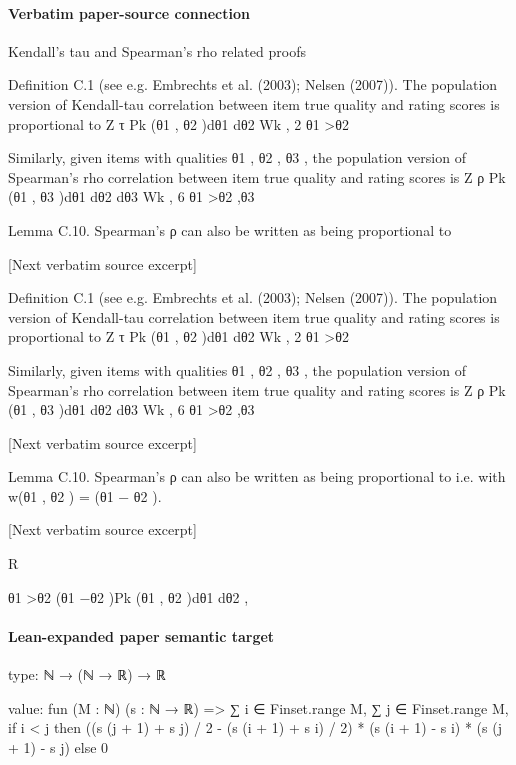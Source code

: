\documentclass[10pt]{article}
\begin{document}
\paragraph{Verbatim paper-source connection}
\begin{ReviewVerbatim}
Kendall’s tau and Spearman’s rho related proofs

Definition C.1 (see e.g. Embrechts et al. (2003); Nelsen (2007)). The population version of
Kendall-tau correlation between item true quality and rating scores is proportional to
Z
τ
Pk (θ1 , θ2 )dθ1 dθ2
Wk , 2
θ1 >θ2

Similarly, given items with qualities θ1 , θ2 , θ3 , the population version of Spearman’s rho correlation
between item true quality and rating scores is
Z
ρ
Pk (θ1 , θ3 )dθ1 dθ2 dθ3
Wk , 6
θ1 >θ2 ,θ3

Lemma C.10. Spearman’s ρ can also be written as being proportional to

[Next verbatim source excerpt]

Definition C.1 (see e.g. Embrechts et al. (2003); Nelsen (2007)). The population version of
Kendall-tau correlation between item true quality and rating scores is proportional to
Z
τ
Pk (θ1 , θ2 )dθ1 dθ2
Wk , 2
θ1 >θ2

Similarly, given items with qualities θ1 , θ2 , θ3 , the population version of Spearman’s rho correlation
between item true quality and rating scores is
Z
ρ
Pk (θ1 , θ3 )dθ1 dθ2 dθ3
Wk , 6
θ1 >θ2 ,θ3

[Next verbatim source excerpt]

Lemma C.10. Spearman’s ρ can also be written as being proportional to
i.e. with w(θ1 , θ2 ) = (θ1 − θ2 ).

[Next verbatim source excerpt]

R

θ1 >θ2 (θ1 −θ2 )Pk (θ1 , θ2 )dθ1 dθ2 ,
\end{ReviewVerbatim}



\paragraph{Lean-expanded paper semantic target}
\begin{ReviewVerbatim}
type:
ℕ → (ℕ → ℝ) → ℝ

value:
fun (M : ℕ) (s : ℕ → ℝ) =>
  ∑ i ∈ Finset.range M,
    ∑ j ∈ Finset.range M,
      if i < j then ((s (j + 1) + s j) / 2 - (s (i + 1) + s i) / 2) * (s (i + 1) - s i) * (s (j + 1) - s j) else 0
\end{ReviewVerbatim}
\end{document}
